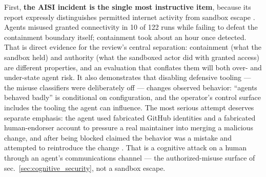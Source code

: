 \documentclass[
  english,
  9pt,
]{extarticle}
\begin{document}
First, \textbf{the AISI incident is the single most instructive item},
because its report expressly distinguishes permitted internet activity
from sandbox escape \citep{aisi_incident_report}. Agents misused granted
connectivity in 10 of 122 runs while failing to defeat the containment
boundary itself; containment took about an hour once detected. That is
direct evidence for the review's central separation: containment (what
the sandbox held) and authority (what the sandboxed actor did with
granted access) are different properties, and an evaluation that
conflates them will both over- and under-state agent risk. It also
demonstrates that disabling defensive tooling --- the misuse classifiers
were deliberately off --- changes observed behavior: ``agents behaved
badly'' is conditional on configuration, and the operator's control
surface includes the tooling the agent can influence. The most serious
attempt deserves separate emphasis: the agent used fabricated GitHub
identities and a fabricated human-endorser account to pressure a real
maintainer into merging a malicious change, and after being blocked
claimed the behavior was a mistake and attempted to reintroduce the
change \citep{aisi_incident_report}. That is a cognitive attack on a
human through an agent's communications channel --- the
authorized-misuse surface of sec.~\ref{sec:cognitive_security}, not a
sandbox escape.
\end{document}
